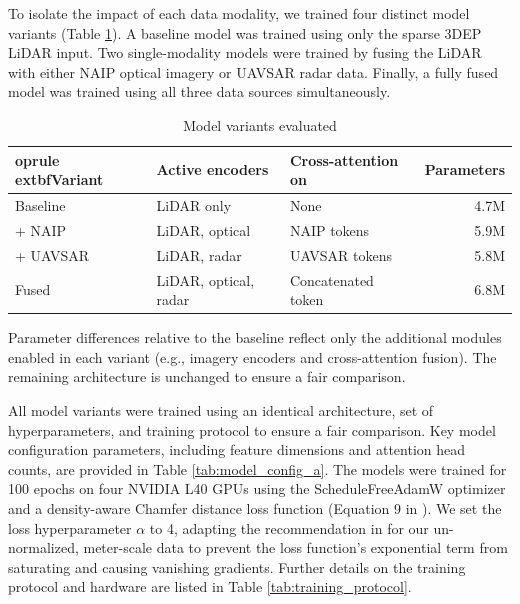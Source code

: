 \documentclass[remotesensing,article,accept,pdftex,moreauthors]{Definitions/mdpi}
\begin{document}
To isolate the impact of each data modality, we trained four distinct model variants (Table \ref{tab:model_variants}). A baseline model was trained using only the sparse 3DEP LiDAR input. Two single-modality models were trained by fusing the LiDAR with either NAIP optical imagery or UAVSAR radar data. Finally, a fully fused model was trained using all three data sources simultaneously.
\begin{table}[htbp]
  \centering
  \begin{threeparttable}
  \caption{Model variants evaluated}
  \label{tab:model_variants}
  \begin{tabular}{lllr}
  	oprule
  	extbf{Variant} & \textbf{Active encoders} & \textbf{Cross-attention on} & \textbf{Parameters} \\
  \midrule
  Baseline & LiDAR only & None  & 4.7M \\
  + NAIP & LiDAR, optical  & NAIP tokens & 5.9M \\
  + UAVSAR & LiDAR, radar & UAVSAR tokens  & 5.8M \\
  Fused  & LiDAR, optical, radar & Concatenated token  & 6.8M \\
  \bottomrule
  \end{tabular}
  \begin{tablenotes}
    \footnotesize
    \item Parameter differences relative to the baseline reflect only the additional modules enabled in each variant (e.g., imagery encoders and cross-attention fusion). The remaining architecture is unchanged to ensure a fair comparison.
  \end{tablenotes}
  \end{threeparttable}
\end{table}


\vspace{-3pt}
All model variants were trained using an identical architecture, set of hyperparameters, and training protocol to ensure a fair comparison. Key model configuration parameters, including feature dimensions and attention head counts, are provided in Table \ref{tab:model_config_a}. The models were trained for 100 epochs on four NVIDIA L40 GPUs using the ScheduleFreeAdamW optimizer \cite{defazio_road_2024} and a density-aware Chamfer distance loss function (Equation 9 in \cite{wu_density-aware_2021}). We set the loss hyperparameter $\alpha$ to 4, adapting the recommendation in \cite{wu_density-aware_2021} for our un-normalized, meter-scale data to prevent the loss function's exponential term from saturating and causing vanishing gradients. Further details on the training protocol and hardware are listed in Table \ref{tab:training_protocol}.
\end{document}

